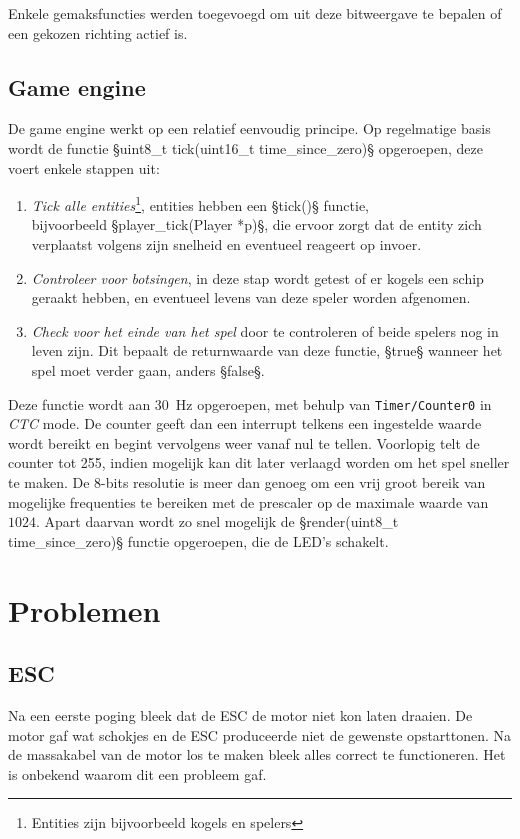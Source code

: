 \documentclass[12pt]{ugentreport}
\begin{document}
Enkele gemaksfuncties werden toegevoegd om uit deze bitweergave te bepalen of
een gekozen richting actief is.

\subsection{Game engine}
De game engine werkt op een relatief eenvoudig principe.
Op regelmatige basis wordt de functie §uint8_t tick(uint16_t time_since_zero)§
opgeroepen, deze voert enkele stappen uit:
\begin{enumerate}
  \item \emph{Tick alle entities}\footnote{Entities zijn bijvoorbeeld kogels en
        spelers}, entities hebben een §tick()§ functie,\\
    bijvoorbeeld §player_tick(Player *p)§, die ervoor zorgt dat de entity zich
    verplaatst volgens zijn snelheid en eventueel reageert op invoer.

  \item \emph{Controleer voor botsingen}, in deze stap wordt getest of er
    kogels een schip geraakt hebben, en eventueel levens van deze speler worden
    afgenomen.

  \item \emph{Check voor het einde van het spel} door te controleren of beide
    spelers nog in leven zijn. Dit bepaalt de returnwaarde van deze functie,
    §true§ wanneer het spel moet verder gaan, anders §false§.
\end{enumerate}

Deze functie wordt aan \SI{30}{\hertz} opgeroepen, met behulp van
\texttt{Timer/Counter0} in \emph{CTC} mode. De counter geeft dan een interrupt
telkens een ingestelde waarde wordt bereikt en begint vervolgens weer vanaf nul
te tellen. Voorlopig telt de counter tot \num{255}, indien mogelijk kan dit
later verlaagd worden om het spel sneller te maken.
De 8-bits resolutie is meer dan genoeg om een vrij
groot bereik van mogelijke frequenties te bereiken met de prescaler op de
maximale waarde van $1024$.
Apart daarvan wordt zo snel mogelijk de §render(uint8_t time_since_zero)§
functie opgeroepen, die de LED's schakelt.

\section{Problemen}
\subsection{ESC}
Na een eerste poging bleek dat de ESC de motor niet kon laten draaien.
De motor gaf wat schokjes en de ESC produceerde niet de gewenste opstarttonen.
Na de massakabel van de motor los te maken bleek alles correct te functioneren.
Het is onbekend waarom dit een probleem gaf.
\end{document}
